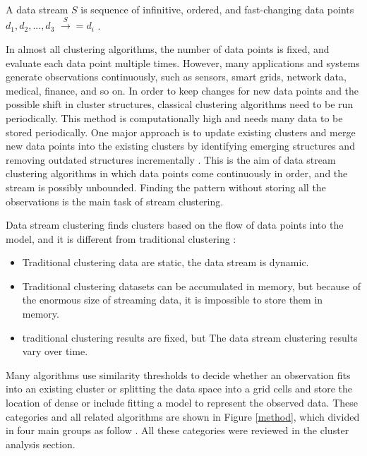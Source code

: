 \documentclass[../UNBThesis2.tex]{subfiles}
\begin{document}

A data stream $S$ is sequence of infinitive, ordered, and fast-changing data points $d_1, d_2, ..., d_3 $ $\xrightarrow S = {d_i}$ \cite{han2011data}.


In almost all clustering algorithms, the number of data points is fixed, and evaluate each data point multiple times. However, many applications and systems generate observations continuously, such as sensors, smart grids, network data, medical, finance, and so on. In order to keep changes for new data points and the possible shift in cluster structures, classical clustering algorithms need to be run periodically. This method is computationally high and needs many data to be stored periodically. One major approach is to update existing clusters and merge new data points into the existing clusters by identifying emerging structures and removing outdated structures incrementally \cite{carnein2019optimizing}. This is the aim of data stream clustering algorithms in which data points come continuously in order, and the stream is possibly unbounded. Finding the pattern without storing all the observations is the main task of stream clustering.

Data stream clustering finds clusters based on the flow of data points into the model, and it is different from traditional clustering \cite{toshniwal2013clustering}:
\begin{itemize}
    \item Traditional clustering data are static, the data stream is dynamic.
    \item Traditional clustering datasets can be accumulated in memory, but because of the enormous size of streaming data, it is impossible to store them in memory.
    \item traditional clustering results are fixed, but The data stream clustering results vary over time.
\end{itemize}



Many algorithms use similarity thresholds to decide whether an observation fits into an existing cluster or splitting the data space into a grid cells and store the location of dense or include fitting a model to represent the observed data. These categories and all related algorithms are shown in Figure \ref{method}, which divided in four main groups as follow \cite{zubaroglu2020data, ghesmoune2016state}. All these categories were reviewed in the cluster analysis section. 
\end{document}
